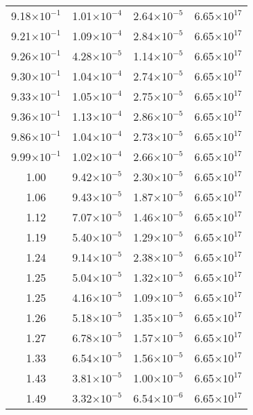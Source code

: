 \documentclass{aa}
\begin{document}
{\begin{longtable}{c|c|c|c}
9.18$\times 10^{-1}$ & 1.01$\times 10^{-4}$ & 2.64$\times 10^{-5}$ & 6.65$\times 10^{17}$  \\
9.21$\times 10^{-1}$ & 1.09$\times 10^{-4}$ & 2.84$\times 10^{-5}$ & 6.65$\times 10^{17}$  \\
9.26$\times 10^{-1}$ & 4.28$\times 10^{-5}$ & 1.14$\times 10^{-5}$ & 6.65$\times 10^{17}$  \\
9.30$\times 10^{-1}$ & 1.04$\times 10^{-4}$ & 2.74$\times 10^{-5}$ & 6.65$\times 10^{17}$  \\
9.33$\times 10^{-1}$ & 1.05$\times 10^{-4}$ & 2.75$\times 10^{-5}$ & 6.65$\times 10^{17}$  \\
9.36$\times 10^{-1}$ & 1.13$\times 10^{-4}$ & 2.86$\times 10^{-5}$ & 6.65$\times 10^{17}$  \\
9.86$\times 10^{-1}$ & 1.04$\times 10^{-4}$ & 2.73$\times 10^{-5}$ & 6.65$\times 10^{17}$  \\
9.99$\times 10^{-1}$ & 1.02$\times 10^{-4}$ & 2.66$\times 10^{-5}$ & 6.65$\times 10^{17}$  \\
1.00                 & 9.42$\times 10^{-5}$ & 2.30$\times 10^{-5}$ & 6.65$\times 10^{17}$  \\
1.06                 & 9.43$\times 10^{-5}$ & 1.87$\times 10^{-5}$ & 6.65$\times 10^{17}$  \\
1.12                 & 7.07$\times 10^{-5}$ & 1.46$\times 10^{-5}$ & 6.65$\times 10^{17}$  \\
1.19                 & 5.40$\times 10^{-5}$ & 1.29$\times 10^{-5}$ & 6.65$\times 10^{17}$  \\
1.24                 & 9.14$\times 10^{-5}$ & 2.38$\times 10^{-5}$ & 6.65$\times 10^{17}$  \\
1.25                 & 5.04$\times 10^{-5}$ & 1.32$\times 10^{-5}$ & 6.65$\times 10^{17}$  \\
1.25                 & 4.16$\times 10^{-5}$ & 1.09$\times 10^{-5}$ & 6.65$\times 10^{17}$  \\
1.26                 & 5.18$\times 10^{-5}$ & 1.35$\times 10^{-5}$ & 6.65$\times 10^{17}$  \\
1.27                 & 6.78$\times 10^{-5}$ & 1.57$\times 10^{-5}$ & 6.65$\times 10^{17}$  \\
1.33                 & 6.54$\times 10^{-5}$ & 1.56$\times 10^{-5}$ & 6.65$\times 10^{17}$  \\
1.43                 & 3.81$\times 10^{-5}$ & 1.00$\times 10^{-5}$ & 6.65$\times 10^{17}$  \\
1.49                 & 3.32$\times 10^{-5}$ & 6.54$\times 10^{-6}$ & 6.65$\times 10^{17}$  \\

\end{longtable}}
\end{document}
